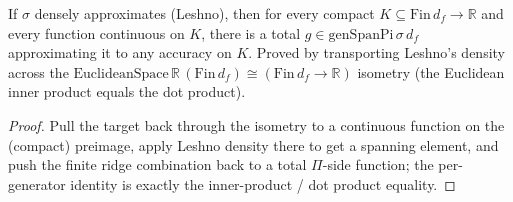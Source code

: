 \begin{lemma}\label{lem:leshno-bridge}
  \leanok
  If $\sigma$ densely approximates (Leshno), then for every compact $K\subseteq\mathrm{Fin}\,d_f\to
  \mathbb{R}$ and every function continuous on $K$, there is a total $g\in\mathrm{genSpanPi}\,
  \sigma\,d_f$ approximating it to any accuracy on $K$. Proved by transporting Leshno's density
  across the $\mathrm{EuclideanSpace}\,\mathbb{R}\,(\mathrm{Fin}\,d_f)\cong(\mathrm{Fin}\,d_f\to
  \mathbb{R})$ isometry (the Euclidean inner product equals the dot product).
\end{lemma}
\begin{proof}\leanok
  Pull the target back through the isometry to a continuous function on the (compact) preimage,
  apply Leshno density there to get a spanning element, and push the finite ridge combination back
  to a total $\Pi$-side function; the per-generator identity is exactly the inner-product / dot
  product equality.
\end{proof}

